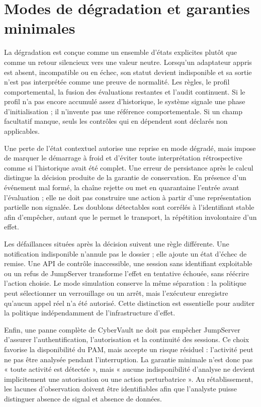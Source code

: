 \documentclass[11pt,a4paper,oneside]{report}
\theoremstyle{definition}
\theoremstyle{plain}
\begin{document}
\section{Modes de dégradation et garanties minimales}

La dégradation est conçue comme un ensemble d'états explicites plutôt que comme
un retour silencieux vers une valeur neutre. Lorsqu'un adaptateur appris est
absent, incompatible ou en échec, son statut devient indisponible et sa sortie
n'est pas interprétée comme une preuve de normalité. Les règles, le profil
comportemental, la fusion des évaluations restantes et l'audit continuent. Si
le profil n'a pas encore accumulé assez d'historique, le système signale une
phase d'initialisation ; il n'invente pas une référence comportementale. Si un
champ facultatif manque, seuls les contrôles qui en dépendent sont déclarés non
applicables.

Une perte de l'état contextuel autorise une reprise en mode dégradé, mais impose
de marquer le démarrage à froid et d'éviter toute interprétation rétrospective
comme si l'historique avait été complet. Une erreur de persistance après le
calcul distingue la décision produite de la garantie de conservation. En
présence d'un événement mal formé, la chaîne rejette ou met en quarantaine
l'entrée avant l'évaluation ; elle ne doit pas construire une action à partir
d'une représentation partielle non signalée. Les doublons détectables sont
corrélés à l'identifiant stable afin d'empêcher, autant que le permet le
transport, la répétition involontaire d'un effet.

Les défaillances situées après la décision suivent une règle différente. Une
notification indisponible n'annule pas le dossier ; elle ajoute un état d'échec
de remise. Une API de contrôle inaccessible, une session sans identifiant
exploitable ou un refus de JumpServer transforme l'effet en tentative échouée,
sans réécrire l'action choisie. Le mode simulation conserve la même séparation :
la politique peut sélectionner un verrouillage ou un arrêt, mais l'exécuteur
enregistre qu'aucun appel réel n'a été autorisé. Cette distinction est
essentielle pour auditer la politique indépendamment de l'infrastructure
d'effet.

Enfin, une panne complète de CyberVault ne doit pas empêcher JumpServer
d'assurer l'authentification, l'autorisation et la continuité des sessions. Ce
choix favorise la disponibilité du PAM, mais accepte un risque résiduel :
l'activité peut ne pas être analysée pendant l'interruption. La garantie
minimale n'est donc pas « toute activité est détectée », mais « aucune
indisponibilité d'analyse ne devient implicitement une autorisation ou une
action perturbatrice ». Au rétablissement, les lacunes d'observation doivent
être identifiables afin que l'analyste puisse distinguer absence de signal et
absence de données.
\end{document}
